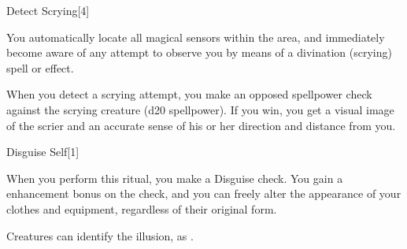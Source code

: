\begin{spellsection}{Detect Scrying}[4]
    \begin{spellheader}
    \end{spellheader}
    \begin{spellcontent}
        \begin{spelltargetinginfo}
        \end{spelltargetinginfo}
        \begin{spelleffects}

            \spellline
            \spelleffect You automatically locate all magical sensors within the area, and immediately become aware of any attempt to observe you by means of a divination (scrying) spell or effect.

            \par When you detect a scrying attempt, you make an opposed spellpower check against the scrying creature (d20 \add spellpower). If you win, you get a visual image of the scrier and an accurate sense of his or her direction and distance from you.
            \spelldur \durext
        \end{spelleffects}
    \end{spellcontent}
    \begin{spellfooter}
    \end{spellfooter}
\end{spellsection}

\begin{spellsection}{Disguise Self}[1]
    \begin{spellheader}
    \end{spellheader}
    \begin{spellcontent}
        \begin{spelltargetinginfo}
        \end{spelltargetinginfo}
        \begin{spelleffects}

            \spelleffect When you perform this ritual, you make a Disguise check. You gain a  enhancement bonus on the check, and you can freely alter the appearance of your clothes and equipment, regardless of their original form.
            \spelldur \durlong \dismissable
        \end{spelleffects}
    \end{spellcontent}
    \begin{spellfooter}
        \spellnotes Creatures can identify the illusion, as .
    \end{spellfooter}
\end{spellsection}

